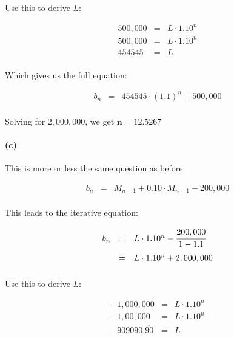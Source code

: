 \documentclass[a4paper]{article}
\begin{document}
Use this to derive $L$:

\begin{equation*}
\begin{array}{rcl}
500,000 & = & L \cdot 1.10^n \\[.08in]
500,000 & = & L \cdot 1.10^n \\[.08in]
454545 & = & L \\[.08in]
\end{array}
\end{equation*}

Which gives us the full equation:

\begin{equation*}
\begin{array}{rcl}
b_n & = & 454545 \cdot (1.1)^n + 500,000 \\[.08in]
\end{array}
\end{equation*}

Solving for $2,000,000$, we get $\mathbf{n = 12.5267}$

\paragraph{(c)} This is more or less the same question as before.

\begin{equation*}
\begin{array}{rcl}
b_n & = & M_{n-1} + 0.10 \cdot M_{n-1} - 200,000 \\[.08in]
\end{array}
\end{equation*}

This leads to the iterative equation:

\begin{equation*}
\begin{array}{rcl}
b_n & = & L \cdot 1.10^n - \cfrac{200,000}{1-1.1 } \\[.15in]
& = & L \cdot 1.10^n + 2,000,000 \\[.08in]
\end{array}
\end{equation*}

Use this to derive $L$:

\begin{equation*}
\begin{array}{rcl}
-1,000,000 & = & L \cdot 1.10^n \\[.08in]
-1,00,000 & = & L \cdot 1.10^n \\[.08in]
-909090.\overline{90} & = & L \\[.08in]
\end{array}
\end{equation*}
\end{document}

